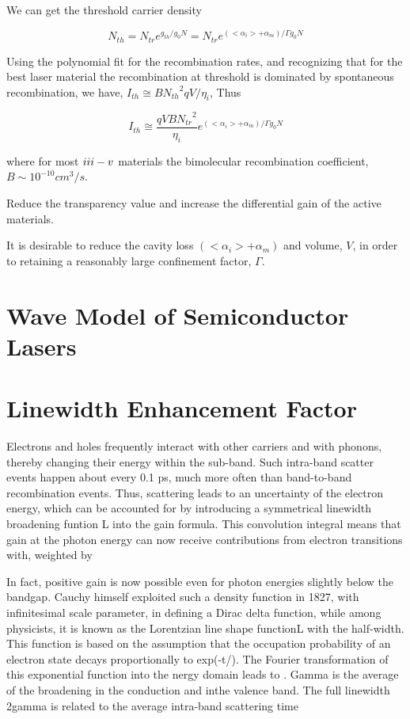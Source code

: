 We can get the threshold carrier density

\begin{equation}
  N_{th} = N_{tr}e^{g_{th}/g_{0}N} = N_{tr}e^{(<\alpha_i> + \alpha_m)/\Gamma{g_{0}}N}
\end{equation}

Using the polynomial fit for the recombination rates, and recognizing that for
the best laser material the recombination at threshold is dominated by
spontaneous recombination, we have, $I_{th}\cong B{N_{th}}^2qV/\eta_i$, Thus

\begin{equation}
  I_{th} {\cong} \frac{qVB{N_{tr}}^2}{\eta_i}e^{(<\alpha_i> + \alpha_m)/\Gamma{g_0}N}
\end{equation}

where for most $\uppercase\expandafter{\romannumeral3} -
\uppercase\expandafter{\romannumeral5}$ materials the bimolecular recombination
coefficient, $B \sim 10^{-10} cm^3/s$.

Reduce the transparency value and increase the differential gain of the active
materials.

It is desirable to reduce the cavity loss $(<\alpha_i> + \alpha_m)$ and volume,
$V$, in order to retaining a reasonably large confinement factor, $\Gamma$.

\section{Wave Model of Semiconductor Lasers} \label{corrections}

\section{Linewidth Enhancement Factor} \label{corrections}

Electrons and holes frequently interact with other carriers and with phonons,
thereby changing their energy within the sub-band. Such intra-band scatter
events happen about every 0.1 ps, much more often than band-to-band
recombination events. Thus, scattering leads to an uncertainty of the electron
energy, which can be accounted for by introducing a symmetrical linewidth
broadening funtion L into the gain formula.  This convolution integral means
that gain at the photon energy can now receive contributions from electron
transitions with, weighted by 

In fact, positive gain is now possible even for photon energies slightly below
the bandgap. Cauchy himself exploited such a density function in 1827, with
infinitesimal scale parameter, in defining a Dirac delta function, while among
physicists, it is known as the Lorentzian line shape functionL with the
half-width. This function is based on the assumption that the occupation
probability of an electron state decays proportionally to exp(-t/). The Fourier
transformation of this exponential function into the nergy domain leads to .
Gamma is the average of the broadening in the conduction and inthe valence
band. The full linewidth 2gamma is related to the average intra-band scattering
time 

